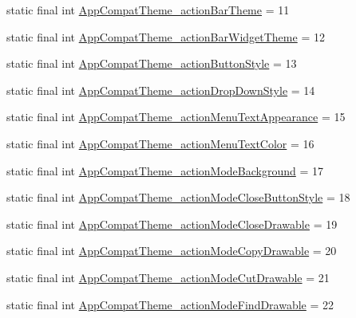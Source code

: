 \begin{DoxyCompactItemize}
static final int \mbox{\hyperlink{classandroid_1_1support_1_1v7_1_1appcompat_1_1_r_1_1styleable_a1fae51d5e6d7d0e64778028b25569704}{App\+Compat\+Theme\+\_\+action\+Bar\+Theme}} = 11
\item 
static final int \mbox{\hyperlink{classandroid_1_1support_1_1v7_1_1appcompat_1_1_r_1_1styleable_acb8aa290e7ba8e77646018aae97d38f4}{App\+Compat\+Theme\+\_\+action\+Bar\+Widget\+Theme}} = 12
\item 
static final int \mbox{\hyperlink{classandroid_1_1support_1_1v7_1_1appcompat_1_1_r_1_1styleable_afeeb64c90f9ae75e7a1b895339cee690}{App\+Compat\+Theme\+\_\+action\+Button\+Style}} = 13
\item 
static final int \mbox{\hyperlink{classandroid_1_1support_1_1v7_1_1appcompat_1_1_r_1_1styleable_aa11a6d533a356428ce240d2754fd06b3}{App\+Compat\+Theme\+\_\+action\+Drop\+Down\+Style}} = 14
\item 
static final int \mbox{\hyperlink{classandroid_1_1support_1_1v7_1_1appcompat_1_1_r_1_1styleable_ae86b38d19839d592116e4074400c1e27}{App\+Compat\+Theme\+\_\+action\+Menu\+Text\+Appearance}} = 15
\item 
static final int \mbox{\hyperlink{classandroid_1_1support_1_1v7_1_1appcompat_1_1_r_1_1styleable_abb0739dbd98e0865a603a331ffccf69a}{App\+Compat\+Theme\+\_\+action\+Menu\+Text\+Color}} = 16
\item 
static final int \mbox{\hyperlink{classandroid_1_1support_1_1v7_1_1appcompat_1_1_r_1_1styleable_aa393102c6de23f6c0fb9a77e5c1d91ca}{App\+Compat\+Theme\+\_\+action\+Mode\+Background}} = 17
\item 
static final int \mbox{\hyperlink{classandroid_1_1support_1_1v7_1_1appcompat_1_1_r_1_1styleable_ae6758f3f0a8f30e0cf030d6c891b319c}{App\+Compat\+Theme\+\_\+action\+Mode\+Close\+Button\+Style}} = 18
\item 
static final int \mbox{\hyperlink{classandroid_1_1support_1_1v7_1_1appcompat_1_1_r_1_1styleable_a3130d5ac1f7e9e6f0c9eb07c18cb214d}{App\+Compat\+Theme\+\_\+action\+Mode\+Close\+Drawable}} = 19
\item 
static final int \mbox{\hyperlink{classandroid_1_1support_1_1v7_1_1appcompat_1_1_r_1_1styleable_ae801af5e60cdafc763cc596213255c88}{App\+Compat\+Theme\+\_\+action\+Mode\+Copy\+Drawable}} = 20
\item 
static final int \mbox{\hyperlink{classandroid_1_1support_1_1v7_1_1appcompat_1_1_r_1_1styleable_a1c8391408fc1ddfd05f29a74aa2164c3}{App\+Compat\+Theme\+\_\+action\+Mode\+Cut\+Drawable}} = 21
\item 
static final int \mbox{\hyperlink{classandroid_1_1support_1_1v7_1_1appcompat_1_1_r_1_1styleable_a2c38964f45322d64ab0aeae35598ae59}{App\+Compat\+Theme\+\_\+action\+Mode\+Find\+Drawable}} = 22

\end{DoxyCompactItemize}
